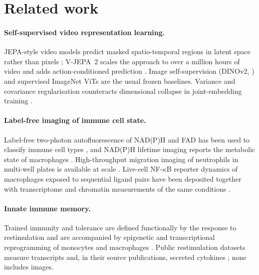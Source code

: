 \section{Related work}
\label{sec:related}
\paragraph{Self-supervised video representation learning.}
JEPA-style video models predict masked spatio-temporal regions in latent space rather than
pixels \citep{vjepa}; V-JEPA~2 scales the approach to over a million hours of video and adds
action-conditioned prediction \citep{vjepa2}. Image self-supervision (DINOv2,
\citealp{dinov2}) and supervised ImageNet ViTs \citep{augreg} are the usual frozen
baselines. Variance and covariance regularisation counteracts
dimensional collapse in joint-embedding training \citep{vicreg}.

\paragraph{Label-free imaging of immune cell state.}
Label-free two-photon autofluorescence of NAD(P)H and FAD has been used to classify immune
cell types \citep{kreiss2026cellmics}, and NAD(P)H lifetime imaging reports the metabolic
state of macrophages \citep{musimbi2025flim}. High-throughput migration imaging of
neutrophils in multi-well plates is available at scale \citep{complexeye}. Live-cell
NF-\(\kappa\)B reporter dynamics of macrophages exposed to sequential ligand pairs have been
deposited together with transcriptome and chromatin measurements of the same conditions
\citep{wang2025}.

\paragraph{Innate immune memory.}
Trained immunity and tolerance are defined functionally by the response to restimulation
\citep{netea2016} and are accompanied by epigenetic and transcriptional reprogramming of
monocytes and macrophages \citep{saeed2014,novakovic2016}. Public restimulation datasets
measure transcripts and, in their source publications, secreted cytokines
\citep{ferreira2023,schrijver2023,moorlag2020}; none includes images.
